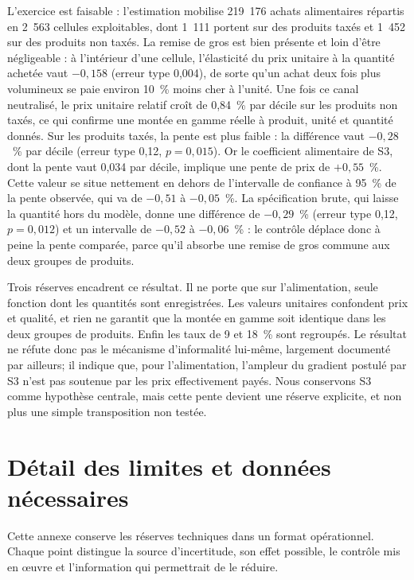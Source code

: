 \documentclass[11pt,a4paper]{article}
\begin{document}
L'exercice est faisable : l'estimation mobilise 219~176 achats alimentaires
répartis en 2~563 cellules exploitables, dont 1~111 portent sur des produits
taxés et 1~452 sur des produits non taxés. La remise de gros est bien présente et
loin d'être négligeable : à l'intérieur d'une cellule, l'élasticité du prix
unitaire à la quantité achetée vaut $-0,158$ (erreur type 0,004), de sorte qu'un
achat deux fois plus volumineux se paie environ 10~\% moins cher à l'unité. Une
fois ce canal neutralisé, le prix unitaire relatif croît de 0,84~\% par décile sur les produits
non taxés, ce qui confirme une montée en gamme réelle à produit, unité et
quantité donnés. Sur les produits taxés, la pente est plus faible : la différence
vaut $-0,28$~\% par décile (erreur type 0,12, $p = 0{,}015$). Or le coefficient
alimentaire de S3, dont la pente vaut 0,034 par décile, implique une pente de
prix de $+0,55$~\%. Cette valeur se situe nettement en dehors de l'intervalle de
confiance à 95~\% de la pente observée, qui va de $-0,51$ à $-0,05$~\%. La
spécification brute, qui laisse la quantité hors du modèle, donne une différence
de $-0,29$~\% (erreur type 0,12, $p = 0{,}012$) et un intervalle de $-0,52$ à
$-0,06$~\% : le contrôle déplace donc à peine la pente comparée, parce qu'il
absorbe une remise de gros commune aux deux groupes de produits.

Trois réserves encadrent ce résultat. Il ne porte que sur l'alimentation, seule
fonction dont les quantités sont enregistrées. Les valeurs unitaires confondent
prix et qualité, et rien ne garantit que la montée en gamme soit identique dans
les deux groupes de produits. Enfin les taux de 9 et 18~\% sont regroupés. Le
résultat ne réfute donc pas le mécanisme d'informalité lui-même, largement
documenté par ailleurs; il indique que, pour l'alimentation, l'ampleur du
gradient postulé par S3 n'est pas soutenue par les prix effectivement payés. Nous
conservons S3 comme hypothèse centrale, mais cette pente devient une réserve
explicite, et non plus une simple transposition non testée.
\clearpage
\section{Détail des limites et données nécessaires}
\label{annexe:limites}

Cette annexe conserve les réserves techniques dans un format opérationnel.
Chaque point distingue la source d'incertitude, son effet possible, le contrôle
mis en \oe{}uvre et l'information qui permettrait de le réduire.
\end{document}
